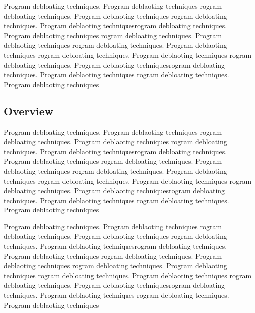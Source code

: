 \documentclass{relatorio}
\begin{document}
Program debloating techniques. Program deblaoting techniques rogram debloating techniques. Program deblaoting techniques
rogram debloating techniques. Program deblaoting techniquesrogram debloating techniques. Program deblaoting techniques
rogram debloating techniques. Program deblaoting techniques rogram debloating techniques. Program deblaoting techniques
rogram debloating techniques. Program deblaoting techniques 
rogram debloating techniques. Program deblaoting techniquesrogram debloating techniques. Program deblaoting techniques
rogram debloating techniques. Program deblaoting techniques

\subsection{Overview}%
\label{Tools}

Program debloating techniques. Program deblaoting techniques rogram debloating techniques. Program deblaoting techniques
rogram debloating techniques. Program deblaoting techniquesrogram debloating techniques. Program deblaoting techniques
rogram debloating techniques. Program deblaoting techniques rogram debloating techniques. Program deblaoting techniques
rogram debloating techniques. Program deblaoting techniques 
rogram debloating techniques. Program deblaoting techniquesrogram debloating techniques. Program deblaoting techniques
rogram debloating techniques. Program deblaoting techniques

Program debloating techniques. Program deblaoting techniques rogram debloating techniques. Program deblaoting techniques
rogram debloating techniques. Program deblaoting techniquesrogram debloating techniques. Program deblaoting techniques
rogram debloating techniques. Program deblaoting techniques rogram debloating techniques. Program deblaoting techniques
rogram debloating techniques. Program deblaoting techniques 
rogram debloating techniques. Program deblaoting techniquesrogram debloating techniques. Program deblaoting techniques
rogram debloating techniques. Program deblaoting techniques
\end{document}
